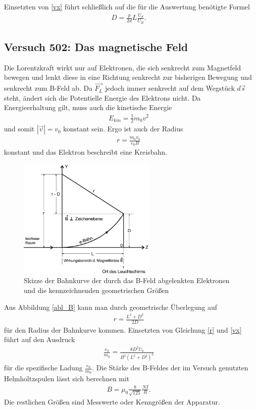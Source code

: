 Einsetzten von \eqref{vx} führt schließlich auf die für die Auswertung benötigte Formel
\begin{align}
D=\frac{p}{2d}L\frac{U_d}{U_B}.
\end{align}

\subsection{Versuch 502: Das magnetische Feld} 
Die Lorentzkraft wirkt nur auf Elektronen, die sich senkrecht zum Magnetfeld bewegen und lenkt diese in eine Richtung senkrecht zur bisherigen Bewegung und senkrecht zum B-Feld ab. Da $\vec{F_L}$ jedoch immer senkrecht auf dem Wegstück $d\vec{s}$ steht, ändert sich die Potentielle Energie des Elektrons nicht. Da Energieerhaltung gilt, muss auch die kinetische Energie
\begin{align*}
E_{kin}=\frac{1}{2}m_0v^2
\end{align*} 
und somit $|\vec{v}|=v_0$ konstant sein.
Ergo ist auch der Radius
\begin{align}
r=\frac{m_0v_0}{e_0B}
\label{r}
\end{align}
konstant und das Elektron beschreibt eine Kreisbahn.

\begin{figure}[htbp]
\includegraphics[width=0.6\textwidth]{pics/Ablenkung_B.png}
\centering
\caption{Skizze der Bahnkurve der durch das B-Feld abgelenkten Elektronen und die kennzeichnenden geometrischen Größen}
\label{abl_B}
\end{figure}

Aus Abbildung \eqref{abl_B} kann man durch geometrische Überlegung auf
\begin{align*}
r=\frac{L^2+D^2}{2D}
\end{align*}
für den Radius der Bahnkurve kommen. Einsetzten von Gleichung \eqref{r} und \eqref{vx} führt auf den Ausdruck
\begin{align}
\frac{e_0}{m_0}=\frac{8D^2U_b}{B^2(L^2+D^2)^2}
\label{spezladung}
\end{align}
für die spezifische Ladung $\frac{e_0}{m_0}$.
Die Stärke des B-Feldes der im Versuch genutzten Helmholtzspulen lässt sich berechnen mit
\begin{align}
B=\mu_0 \frac{8}{\sqrt{125}} \frac{NI}{R}.
\label{helmholtz_B}
\end{align}
Die restlichen Größen sind Messwerte oder Kenngrößen der Apparatur.

